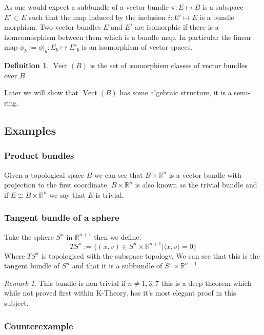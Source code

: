\documentclass[a4paper,10pt]{article}
\theoremstyle{plain}%
\theoremstyle{definition}
\newtheorem{defn}{Definition}
\theoremstyle{remark}
\newtheorem{rem}{Remark}
\newcommand{\RR}{\mathbb{R}}
\DeclareMathOperator{\Vect}{Vect}
\begin{document}
As one would expect a subbundle of a vector bundle $\pi:E\mapsto B$ is a subspace $E'\subset E$
such that the map induced by the inclusion $i:E'\mapsto E$ is a bundle morphism. Two 
vector bundles $E$ and $E'$ are isomorphic if there is a homeomorphism between them which is a bundle map.
In particular the linear map $\phi_b:=\phi|_b :E_b \mapsto E'_b$ is an isomorphism of vector spaces.

\begin{defn}
  $\Vect(B)$ is the set of isomorphism classes of vector bundles over $B$
\end{defn}

Later we will show that $\Vect(B)$ has some algebraic structure, it is a semi-ring.

\subsection{Examples}

\subsubsection{Product bundles}

Given a topological space $B$ we can see that $B\times \RR^n$ is a vector bundle with projection to
the first coordinate. $B \times\RR^n$ is also known as the trivial bundle and if $E\cong B\times \RR^n$ 
we say that $E$ is trivial.

\subsubsection{Tangent bundle of a sphere}

Take the sphere $S^n$ in $\RR^{n+1}$ then we define:
$$TS^n:=\{(x,v) \in S^n\times \RR^{n+1} | \langle x,v \rangle =0\} $$
Where $TS^n$ is topologised with the subspace topology.
We can see that this is the tangent bundle of $S^n$ and that it is a subbundle of $S^n\times \RR^{n+1}$.

\begin{rem}
 This bundle is non-trivial if $n\neq 1,3,7$ this is a deep theorem which while not proved first within 
K-Theory, has it's most elegant proof in this subject.
\end{rem}


\subsubsection{Counterexample}
\end{document}
